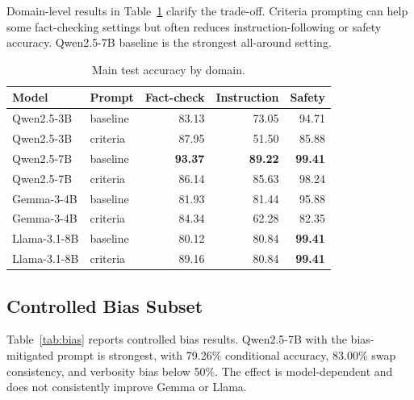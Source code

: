 \documentclass[pdflatex,sn-mathphys-num]{sn-jnl}
\begin{document}
Domain-level results in Table~\ref{tab:domain} clarify the trade-off. Criteria prompting can help some fact-checking settings but often reduces instruction-following or safety accuracy. Qwen2.5-7B baseline is the strongest all-around setting.

\begin{table}[t]
\caption{Main test accuracy by domain.}
\label{tab:domain}
\centering
\footnotesize
\begin{tabular}{llrrr}
\toprule
Model & Prompt & Fact-check & Instruction & Safety \\
\midrule
Qwen2.5-3B & baseline & 83.13 & 73.05 & 94.71 \\
Qwen2.5-3B & criteria & 87.95 & 51.50 & 85.88 \\
Qwen2.5-7B & baseline & \textbf{93.37} & \textbf{89.22} & \textbf{99.41} \\
Qwen2.5-7B & criteria & 86.14 & 85.63 & 98.24 \\
Gemma-3-4B & baseline & 81.93 & 81.44 & 95.88 \\
Gemma-3-4B & criteria & 84.34 & 62.28 & 82.35 \\
Llama-3.1-8B & baseline & 80.12 & 80.84 & \textbf{99.41} \\
Llama-3.1-8B & criteria & 89.16 & 80.84 & \textbf{99.41} \\
\bottomrule
\end{tabular}
\end{table}

\subsection{Controlled Bias Subset}

Table~\ref{tab:bias} reports controlled bias results. Qwen2.5-7B with the bias-mitigated prompt is strongest, with 79.26\% conditional accuracy, 83.00\% swap consistency, and verbosity bias below 50\%. The effect is model-dependent and does not consistently improve Gemma or Llama.
\end{document}
